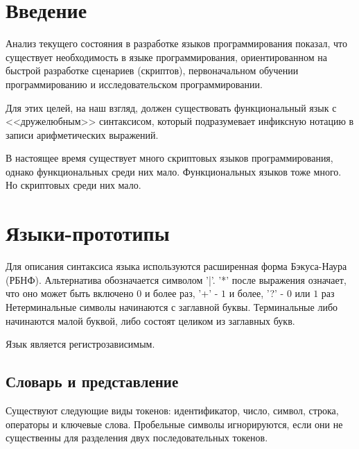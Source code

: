 \section*{Введение}
    Анализ текущего состояния в разработке языков программирования показал, что существует необходимость в языке программирования, ориентированном на быстрой разработке сценариев (скриптов), первоначальном обучении программированию и исследовательском программировании.

    Для этих целей, на наш взгляд, должен существовать функциональный язык с <<дружелюбным>> синтаксисом, который подразумевает инфиксную нотацию в записи арифметических выражений.

    В настоящее время существует много скриптовых языков программирования, однако функциональных среди них мало.
    Функциональных языков тоже много.
    Но скриптовых среди них мало.
\section{Языки-прототипы}
    Для описания синтаксиса языка используются расширенная форма Бэкуса-Наура (РБНФ). 
    Альтернатива обозначается символом '|'. 
    '*' после выражения означает, что оно может быть включено $0$ и более раз, '+' - $1$ и более, '?' - $0$ или $1$ раз%
    Нетерминальные символы начинаются с заглавной буквы. 
    Терминальные либо начинаются малой буквой, либо состоят целиком из заглавных букв.

    Язык является регистрозависимым.

    \subsection{Словарь и представление}
        Существуют следующие виды токенов: идентификатор, число, символ, строка, операторы и ключевые слова.
        Пробельные символы игнорируются, если они не существенны для разделения двух последовательных токенов.


